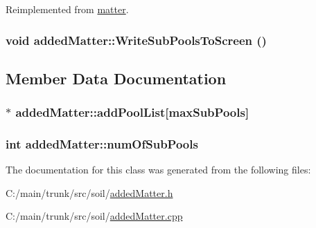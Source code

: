 Reimplemented from \hyperlink{classmatter_a69825448805e58acc5418362a11eac2b}{matter}.\hypertarget{classadded_matter_a4c80ef0a6ae9baf0f86537bc77d3a181}{
\subsubsection[{WriteSubPoolsToScreen}]{\setlength{\rightskip}{0pt plus 5cm}void addedMatter::WriteSubPoolsToScreen ()}}
\label{classadded_matter_a4c80ef0a6ae9baf0f86537bc77d3a181}


\subsection{Member Data Documentation}
\hypertarget{classadded_matter_a984f8ee184aab9aa9591368b053133b3}{
\subsubsection[{addPoolList}]{$\ast$ {\bf addedMatter::addPoolList}\mbox{[}maxSubPools\mbox{]}}}
\label{classadded_matter_a984f8ee184aab9aa9591368b053133b3}
\hypertarget{classadded_matter_a65b5923128f9e623e00ec57f8b350397}{
\subsubsection[{numOfSubPools}]{\setlength{\rightskip}{0pt plus 5cm}int {\bf addedMatter::numOfSubPools}}}
\label{classadded_matter_a65b5923128f9e623e00ec57f8b350397}


The documentation for this class was generated from the following files:\begin{DoxyCompactItemize}
\item 
C:/main/trunk/src/soil/\hyperlink{added_matter_8h}{addedMatter.h}\item 
C:/main/trunk/src/soil/\hyperlink{added_matter_8cpp}{addedMatter.cpp}\end{DoxyCompactItemize}
